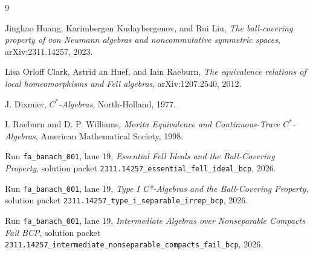 \documentclass[11pt]{article}
\begin{document}
\begin{thebibliography}{9}

Jinghao Huang, Karimbergen Kudaybergenov, and Rui Liu,
\emph{The ball-covering property of von Neumann algebras and noncommutative
symmetric spaces},
arXiv:2311.14257, 2023.

Lisa Orloff Clark, Astrid an Huef, and Iain Raeburn,
\emph{The equivalence relations of local homeomorphisms and Fell algebras},
arXiv:1207.2540, 2012.

J. Dixmier,
\emph{\(C^*\)-Algebras},
North-Holland, 1977.

I. Raeburn and D. P. Williams,
\emph{Morita Equivalence and Continuous-Trace \(C^*\)-Algebras},
American Mathematical Society, 1998.

Run \texttt{fa\_banach\_001}, lane 19,
\emph{Essential Fell Ideals and the Ball-Covering Property},
solution packet
\texttt{2311.14257\_essential\_fell\_ideal\_bcp}, 2026.

Run \texttt{fa\_banach\_001}, lane 19,
\emph{Type I C*-Algebras and the Ball-Covering Property},
solution packet
\texttt{2311.14257\_type\_i\_separable\_irrep\_bcp}, 2026.

Run \texttt{fa\_banach\_001}, lane 19,
\emph{Intermediate Algebras over Nonseparable Compacts Fail BCP},
solution packet
\texttt{2311.14257\_intermediate\_nonseparable\_compacts\_fail\_bcp}, 2026.

\end{thebibliography}
\end{document}
